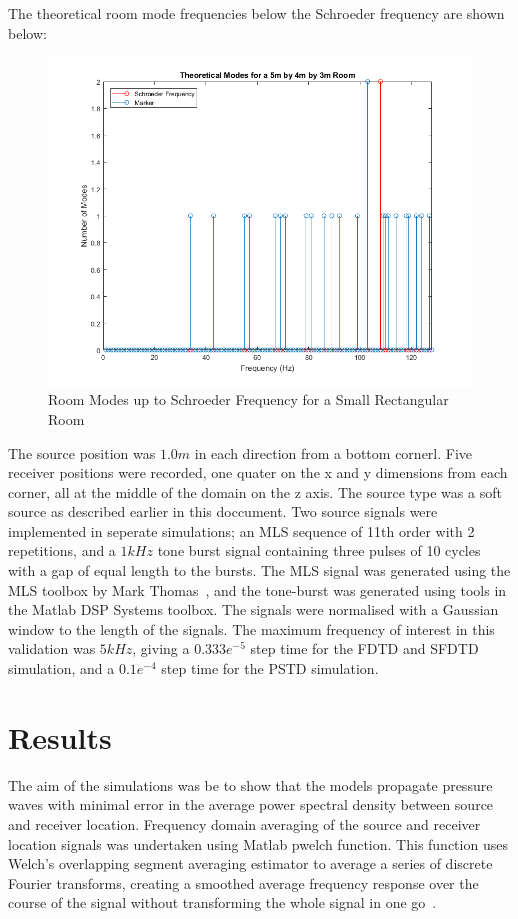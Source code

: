 The theoretical room mode frequencies below the Schroeder frequency are shown below:\\
\begin{figure}[H]
\centering
  \includegraphics[width=\textwidth]{./graphics/modesuptoschr.png}
  \caption{Room Modes up to Schroeder Frequency for a Small Rectangular Room}
\end{figure}

The source position was $1.0m$ in each direction from a bottom cornerl. Five receiver positions were recorded, one quater on the x and y dimensions from each corner, all at the middle of the domain on the z axis. The source type was a soft source as described earlier in this doccument. Two source signals were implemented in seperate simulations; an MLS sequence of 11th order with 2 repetitions, and a $1kHz$ tone burst signal containing three pulses of 10 cycles with a gap of equal length to the bursts. The MLS signal was generated using the MLS toolbox by Mark Thomas~\cite{Mrt2008}, and the tone-burst was generated using tools in the Matlab DSP Systems toolbox. The signals were normalised with a Gaussian window to the length of the signals. The maximum frequency of interest in this validation was $5kHz$, giving a $0.333e^{-5}$ step time for the FDTD and SFDTD simulation, and a $0.1e^{-4}$ step time for the PSTD simulation.

\section{Results}
The aim of the simulations was be to show that the models propagate pressure waves with minimal error in the average power spectral density between source and receiver location. Frequency domain averaging of the source and receiver location signals was undertaken using Matlab pwelch function. This function uses Welch's overlapping segment averaging estimator to average a series of discrete Fourier transforms, creating a smoothed average frequency response over the course of the signal without transforming the whole signal in one go~\cite{Welch1967}.

